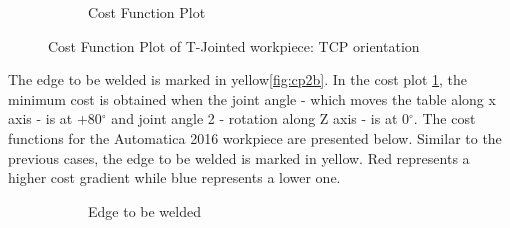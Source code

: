 \begin{figure}[!htbp]
\begin{subfigure}[b]{0.4\textwidth}
		\caption{Cost Function Plot}  
		\label{fig:cp2a}
	\end{subfigure}	
	\caption{Cost Function Plot of T-Jointed workpiece: TCP orientation}
	\label{fig:cp2}
\end{figure}
The edge to be welded is marked in yellow\ref{fig:cp2b}. In the cost plot \ref{fig:cp2a}, the minimum cost is obtained when the joint angle - which moves the table along x axis - is at +80$^{\circ}$ and joint angle 2 - rotation along Z axis - is at 0$^{\circ}$.
\clearpage
The cost functions for the Automatica 2016 workpiece are presented below. Similar to the previous cases, the edge to be welded is marked in yellow. Red represents a higher cost gradient while blue represents a lower one.

\begin{figure}[!htbp] %
	\centering
	\begin{subfigure}[b]{0.4\textwidth}
		\caption{Edge to be welded}  
		\label{fig:cp3b}
	\end{subfigure}
	\begin{subfigure}[b]{0.4\textwidth}

\end{subfigure}
\end{figure}

